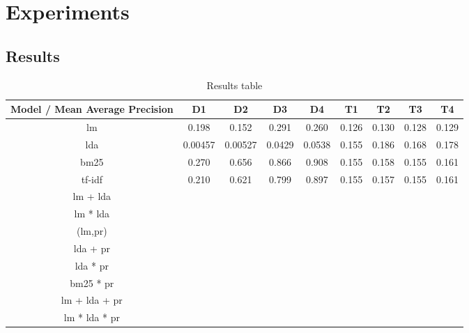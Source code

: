 \section{Experiments}\label{sec:experiment}


\subsection{Results}\label{subsec:results}

\begin{table*}[h]
	\centering
	\caption{Results table}
	\begin{tabular}{c|c|c|c|c|c|c|c|c}
		Model / Mean Average Precision & D1 & D2 & D3 & D4 & T1 & T2 & T3 & T4 \\
		\midrule
		\gls{lm} & 0.198 & 0.152 & 0.291 & 0.260 & 0.126 & 0.130 & 0.128 & 0.129 \\  
		\gls{lda} & 0.00457 & 0.00527 & 0.0429 & 0.0538 & 0.155 & 0.186 & 0.168 & 0.178 \\
		\gls{bm25} & 0.270 & 0.656 & 0.866 & 0.908 & 0.155 & 0.158 & 0.155 & 0.161 \\
		\gls{tf-idf} & 0.210 & 0.621 & 0.799 & 0.897 & 0.155 & 0.157 & 0.155 & 0.161 \\
		\gls{lm} + \gls{lda} & & & & & & & & \\
		\gls{lm} * \gls{lda} & & & & & & & & \\
		(\gls{lm},\gls{pr}) & & & & & & & & \\
		\gls{lda} + \gls{pr} & & & & & & & & \\
		\gls{lda} * \gls{pr} & & & & & & & & \\
		\gls{bm25} * \gls{pr} & & & & & & & & \\
		\gls{lm} + \gls{lda} + \gls{pr} & & & & & & & & \\
		\gls{lm} * \gls{lda} * \gls{pr} & & & & & & & & \\
	\end{tabular}
	
	\label{tab:results}
\end{table*}